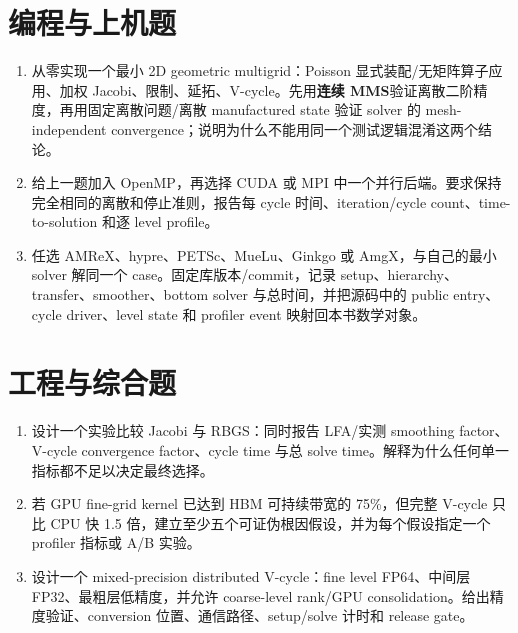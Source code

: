 \section*{编程与上机题}
\begin{enumerate}
\item 从零实现一个最小 2D geometric multigrid：Poisson 显式装配/无矩阵算子应用、加权 Jacobi、限制、延拓、V-cycle。先用\textbf{连续 MMS}验证离散二阶精度，再用固定离散问题/离散 manufactured state 验证 solver 的 mesh-independent convergence；说明为什么不能用同一个测试逻辑混淆这两个结论。
\item 给上一题加入 OpenMP，再选择 CUDA 或 MPI 中一个并行后端。要求保持完全相同的离散和停止准则，报告每 cycle 时间、iteration/cycle count、time-to-solution 和逐 level profile。
\item 任选 AMReX、hypre、PETSc、MueLu、Ginkgo 或 AmgX，与自己的最小 solver 解同一个 case。固定库版本/commit，记录 setup、hierarchy、transfer、smoother、bottom solver 与总时间，并把源码中的 public entry、cycle driver、level state 和 profiler event 映射回本书数学对象。
\end{enumerate}

\section*{工程与综合题}
\begin{enumerate}
\item 设计一个实验比较 Jacobi 与 RBGS：同时报告 LFA/实测 smoothing factor、V-cycle convergence factor、cycle time 与总 solve time。解释为什么任何单一指标都不足以决定最终选择。
\item 若 GPU fine-grid kernel 已达到 HBM 可持续带宽的 75\%，但完整 V-cycle 只比 CPU 快 1.5 倍，建立至少五个可证伪根因假设，并为每个假设指定一个 profiler 指标或 A/B 实验。
\item 设计一个 mixed-precision distributed V-cycle：fine level FP64、中间层 FP32、最粗层低精度，并允许 coarse-level rank/GPU consolidation。给出精度验证、conversion 位置、通信路径、setup/solve 计时和 release gate。
\end{enumerate}
